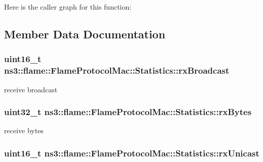 Here is the caller graph for this function\+:




\subsection{Member Data Documentation}
\subsubsection[{\texorpdfstring{rx\+Broadcast}{rxBroadcast}}]{\setlength{\rightskip}{0pt plus 5cm}uint16\+\_\+t ns3\+::flame\+::\+Flame\+Protocol\+Mac\+::\+Statistics\+::rx\+Broadcast}\hypertarget{structns3_1_1flame_1_1FlameProtocolMac_1_1Statistics_afaa1e959738fc658e689eb501b66a357}{}\label{structns3_1_1flame_1_1FlameProtocolMac_1_1Statistics_afaa1e959738fc658e689eb501b66a357}


receive broadcast 

\subsubsection[{\texorpdfstring{rx\+Bytes}{rxBytes}}]{\setlength{\rightskip}{0pt plus 5cm}uint32\+\_\+t ns3\+::flame\+::\+Flame\+Protocol\+Mac\+::\+Statistics\+::rx\+Bytes}\hypertarget{structns3_1_1flame_1_1FlameProtocolMac_1_1Statistics_a519e7e2a79a3b16700f633672c97ff76}{}\label{structns3_1_1flame_1_1FlameProtocolMac_1_1Statistics_a519e7e2a79a3b16700f633672c97ff76}


receive bytes 

\subsubsection[{\texorpdfstring{rx\+Unicast}{rxUnicast}}]{\setlength{\rightskip}{0pt plus 5cm}uint16\+\_\+t ns3\+::flame\+::\+Flame\+Protocol\+Mac\+::\+Statistics\+::rx\+Unicast}\hypertarget{structns3_1_1flame_1_1FlameProtocolMac_1_1Statistics_a6de469d2dffb7dad53e67a0d5e4c7c3d}{}\label{structns3_1_1flame_1_1FlameProtocolMac_1_1Statistics_a6de469d2dffb7dad53e67a0d5e4c7c3d}


